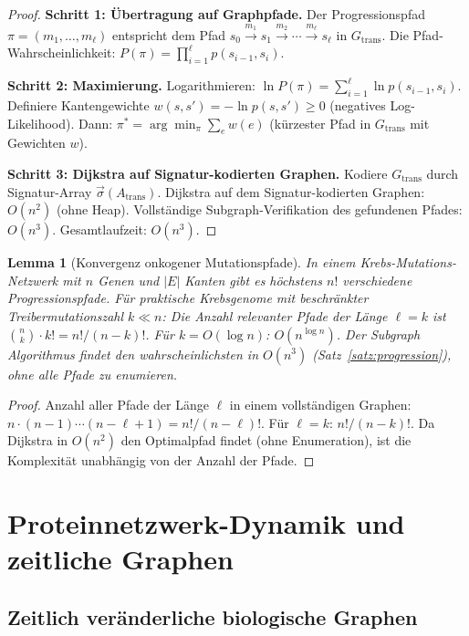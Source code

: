 ﻿\documentclass[a4paper,12pt]{article}
\theoremstyle{plain}
\newtheorem{lemma}{Lemma}
\theoremstyle{definition}
\theoremstyle{remark}
\newcommand{\sigvec}{\vec{\sigma}}
\begin{document}
\begin{proof}
\textbf{Schritt 1: \"Ubertragung auf Graphpfade.}
Der Progressionspfad $\pi = (m_1, \ldots, m_\ell)$ entspricht dem Pfad
$s_0 \xrightarrow{m_1} s_1 \xrightarrow{m_2} \cdots \xrightarrow{m_\ell} s_\ell$
in $G_{\mathrm{trans}}$.
Die Pfad-Wahrscheinlichkeit:
$P(\pi) = \prod_{i=1}^\ell p(s_{i-1}, s_i)$.

\textbf{Schritt 2: Maximierung.}
Logarithmieren: $\ln P(\pi) = \sum_{i=1}^\ell \ln p(s_{i-1}, s_i)$.
Definiere Kantengewichte $w(s,s') = -\ln p(s,s') \geq 0$
(negatives Log-Likelihood).
Dann: $\pi^* = \arg\min_\pi \sum_e w(e)$ (k\"urzester Pfad in $G_{\mathrm{trans}}$
mit Gewichten $w$).

\textbf{Schritt 3: Dijkstra auf Signatur-kodierten Graphen.}
Kodiere $G_{\mathrm{trans}}$ durch Signatur-Array $\sigvec(A_{\mathrm{trans}})$.
Dijkstra auf dem Signatur-kodierten Graphen: $O(n^2)$ (ohne Heap).
Vollst\"andige Subgraph-Verifikation des gefundenen Pfades: $O(n^3)$.
Gesamtlaufzeit: $O(n^3)$.
\end{proof}

\begin{lemma}[Konvergenz onkogener Mutationspfade]
\label{lem:konvergenz_mutation}
In einem Krebs-Mutations-Netzwerk mit $n$ Genen und $|E|$ Kanten gibt es
h\"ochstens $n!$ verschiedene Progressionspfade.
F\"ur praktische Krebsgenome mit beschr\"ankter Treibermutationszahl $k \ll n$:
Die Anzahl relevanter Pfade der L\"ange $\ell = k$ ist $\binom{n}{k} \cdot k!
= n!/(n-k)!$. F\"ur $k = O(\log n)$: $O(n^{\log n})$.
Der Subgraph Algorithmus findet den wahrscheinlichsten in $O(n^3)$
(Satz~\ref{satz:progression}), ohne alle Pfade zu enumieren.
\end{lemma}

\begin{proof}
Anzahl aller Pfade der L\"ange $\ell$ in einem vollst\"andigen Graphen:
$n \cdot (n-1) \cdots (n-\ell+1) = n!/(n-\ell)!$.
F\"ur $\ell = k$: $n!/(n-k)!$.
Da Dijkstra in $O(n^2)$ den Optimalpfad findet (ohne Enumeration),
ist die Komplexit\"at unabh\"angig von der Anzahl der Pfade.
\end{proof}

\section{Proteinnetzwerk-Dynamik und zeitliche Graphen}

\subsection{Zeitlich ver\"anderliche biologische Graphen}
\end{document}
